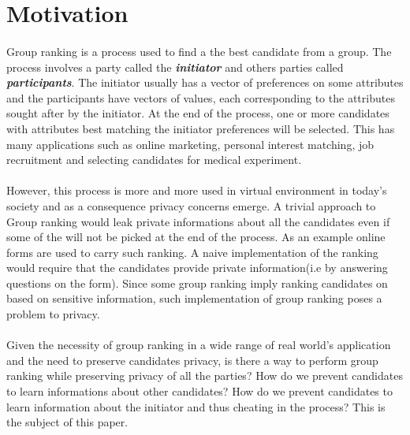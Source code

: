 \documentclass[11pt, a4paper, twoside, openright]{book} %
\begin{document}


\newpage

\section{Motivation}

\paragraph{}
Group ranking is a process used to find a the best candidate from a group. The process involves a party called the \textbf{\textit{initiator}} 
and others parties called \textbf{\textit{participants}}. 
The initiator usually has a vector of preferences on some attributes and the participants have vectors of values, each corresponding to the attributes sought after by the initiator. At the end of the process, one or more candidates with attributes best matching the initiator preferences will be selected.
This has many applications such as online marketing,
personal interest matching, job recruitment  and selecting candidates for medical experiment.

\paragraph{}
However, this process is more and more used in virtual environment in today's society and as a consequence privacy concerns emerge. A trivial approach to Group ranking would leak private informations about all the candidates even if some of the will not be picked at the end of the process. As an example online forms are used to carry such ranking. A naive implementation of the ranking would require that the candidates provide private information(i.e by answering questions on the form). Since some group ranking imply ranking candidates on based on sensitive information, such implementation of group ranking poses a problem to privacy. 
\paragraph{}
Given the necessity of group ranking in a wide range of real world's application and the need to preserve candidates privacy, is there a way to perform group ranking while preserving privacy of all the parties? How do we prevent candidates to learn informations about other candidates? How do we prevent candidates to learn information about the initiator and thus cheating in the process? This is the subject of this paper.
\end{document}
